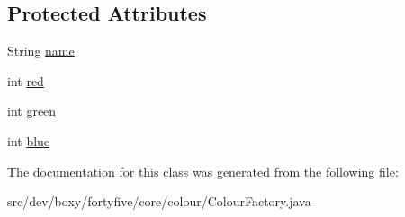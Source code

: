 \subsection*{Protected Attributes}
\begin{DoxyCompactItemize}
\item 
String \hyperlink{group__colours_ga4d56f9874f82e7285e41c8a295069047}{name}
\item 
int \hyperlink{group__colours_gab62f99627952fcf9923c257b8a6da024}{red}
\item 
int \hyperlink{group__colours_gab377d979269fd05f929493dc79ee074a}{green}
\item 
int \hyperlink{group__colours_gaa387e90b3938158d073d2aeae5105111}{blue}
\end{DoxyCompactItemize}


The documentation for this class was generated from the following file:\begin{DoxyCompactItemize}
\item 
src/dev/boxy/fortyfive/core/colour/ColourFactory.java\end{DoxyCompactItemize}
